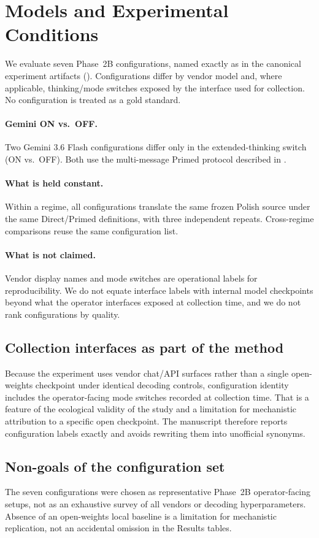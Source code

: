 \section{Models and Experimental Conditions}
\label{sec:models}

We evaluate seven Phase~2B configurations, named exactly as in the canonical experiment artifacts ().
Configurations differ by vendor model and, where applicable, thinking/mode switches exposed by the interface used for collection.
No configuration is treated as a gold standard.



\paragraph{Gemini ON vs.\ OFF.}
Two Gemini 3.6 Flash configurations differ only in the extended-thinking switch (ON vs.\ OFF).
Both use the multi-message Primed protocol described in .

\paragraph{What is held constant.}
Within a regime, all configurations translate the same frozen Polish source under the same Direct/Primed definitions, with three independent repeats.
Cross-regime comparisons reuse the same configuration list.

\paragraph{What is not claimed.}
Vendor display names and mode switches are operational labels for reproducibility.
We do not equate interface labels with internal model checkpoints beyond what the operator interfaces exposed at collection time, and we do not rank configurations by quality.


\subsection{Collection interfaces as part of the method}
Because the experiment uses vendor chat/API surfaces rather than a single open-weights checkpoint under identical decoding controls, configuration identity includes the operator-facing mode switches recorded at collection time.
That is a feature of the ecological validity of the study and a limitation for mechanistic attribution to a specific open checkpoint.
The manuscript therefore reports configuration labels exactly and avoids rewriting them into unofficial synonyms.


\subsection{Non-goals of the configuration set}
The seven configurations were chosen as representative Phase~2B operator-facing setups, not as an exhaustive survey of all vendors or decoding hyperparameters.
Absence of an open-weights local baseline is a limitation for mechanistic replication, not an accidental omission in the Results tables.
